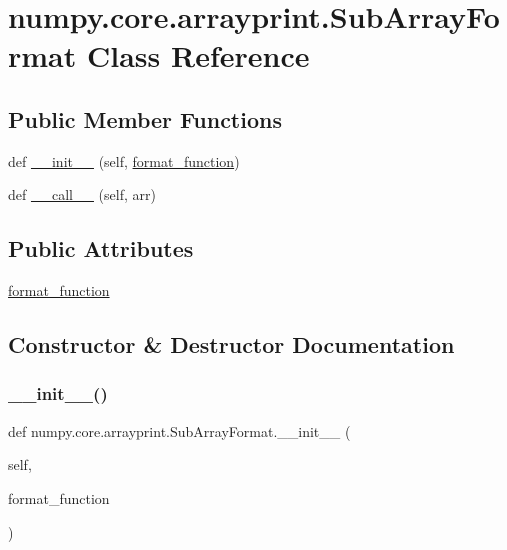 \hypertarget{classnumpy_1_1core_1_1arrayprint_1_1SubArrayFormat}{}\section{numpy.\+core.\+arrayprint.\+Sub\+Array\+Format Class Reference}
\label{classnumpy_1_1core_1_1arrayprint_1_1SubArrayFormat}
\subsection*{Public Member Functions}
\begin{DoxyCompactItemize}
\item 
def \hyperlink{classnumpy_1_1core_1_1arrayprint_1_1SubArrayFormat_a2dcb08853ac5ed155d861d2928616487}{\+\_\+\+\_\+init\+\_\+\+\_\+} (self, \hyperlink{classnumpy_1_1core_1_1arrayprint_1_1SubArrayFormat_a779331008c9f6d691ccc7d97d2ea4f42}{format\+\_\+function})
\item 
def \hyperlink{classnumpy_1_1core_1_1arrayprint_1_1SubArrayFormat_aea8f48b17a2e737488eb0e7664273d78}{\+\_\+\+\_\+call\+\_\+\+\_\+} (self, arr)
\end{DoxyCompactItemize}
\subsection*{Public Attributes}
\begin{DoxyCompactItemize}
\item 
\hyperlink{classnumpy_1_1core_1_1arrayprint_1_1SubArrayFormat_a779331008c9f6d691ccc7d97d2ea4f42}{format\+\_\+function}
\end{DoxyCompactItemize}


\subsection{Constructor \& Destructor Documentation}
\mbox{\label{classnumpy_1_1core_1_1arrayprint_1_1SubArrayFormat_a2dcb08853ac5ed155d861d2928616487}} 
\subsubsection{\texorpdfstring{\+\_\+\+\_\+init\+\_\+\+\_\+()}{\_\_init\_\_()}}
{\footnotesize\ttfamily def numpy.\+core.\+arrayprint.\+Sub\+Array\+Format.\+\_\+\+\_\+init\+\_\+\+\_\+ (\begin{DoxyParamCaption}\item[{}]{self,  }\item[{}]{format\+\_\+function }\end{DoxyParamCaption})}



